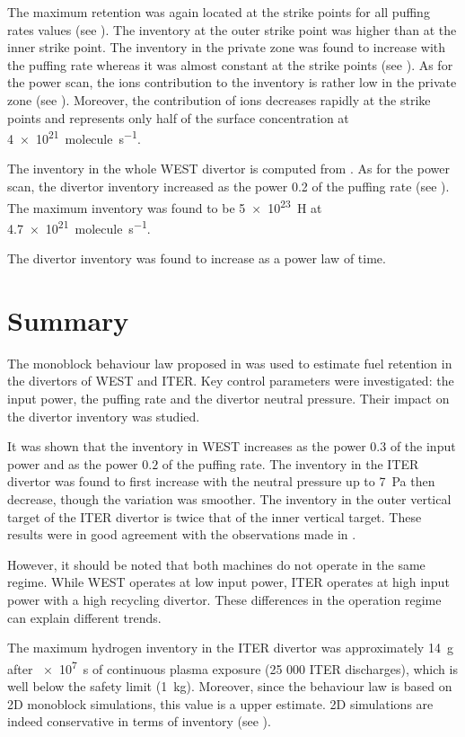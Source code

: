 The maximum retention was again located at the strike points for all puffing rates values (see ).
The inventory at the outer strike point was higher than at the inner strike point.
The inventory in the private zone was found to increase with the puffing rate whereas it was almost constant at the strike points (see ).
As for the power scan, the ions contribution to the inventory is rather low in the private zone (see ).
Moreover, the contribution of ions decreases rapidly at the strike points and represents only half of the surface concentration at \SI{4e21}{molecule.s^{-1}}.

The inventory in the whole WEST divertor is computed from .
As for the power scan, the divertor inventory increased as the power 0.2 of the puffing rate (see ).
The maximum inventory was found to be \SI{5e23}{H} at \SI{4.7e21}{molecule.s^{-1}}.

The divertor inventory was found to increase as a power law of time.

\section{Summary}


The monoblock behaviour law proposed in  was used to estimate fuel retention in the divertors of WEST and ITER.
Key control parameters were investigated: the input power, the puffing rate and the divertor neutral pressure.
Their impact on the divertor inventory was studied.

It was shown that the inventory in WEST increases as the power $0.3$ of the input power and as the power $0.2$ of the puffing rate.
The inventory in the ITER divertor was found to first increase with the neutral pressure up to \SI{7}{Pa} then decrease, though the variation was smoother.
The inventory in the outer vertical target of the ITER divertor is twice that of the inner vertical target.
These results were in good agreement with the observations made in .

However, it should be noted that both machines do not operate in the same regime.
While WEST operates at low input power, ITER operates at high input power with a high recycling divertor.
These differences in the operation regime can explain different trends.

The maximum hydrogen inventory in the ITER divertor was approximately \SI{14}{g} after \SI{e7}{s} of continuous plasma exposure (25 000 ITER discharges), which is well below the safety limit (\SI{1}{kg}).
Moreover, since the behaviour law is based on 2D monoblock simulations, this value is a upper estimate.
2D simulations are indeed conservative in terms of inventory (see ).

